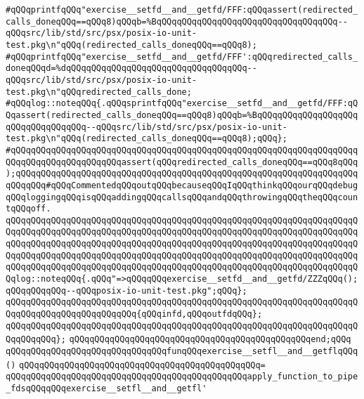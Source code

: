 \newline
\verb|#qQQqprintfqQQq"exercise__setfd__and__getfd/FFF:qQQqassert(redirected_calls_doneqQQq==qQQq8)qQQqb=%BqQQqqQQqqQQqqQQqqQQqqQQqqQQqqQQqqQQq--qQQqsrc/lib/std/src/psx/posix-io-unit-test.pkg\n"qQQq(redirected_calls_doneqQQq==qQQq8);|\newline
\verb|#qQQqprintfqQQq"exercise__setfd__and__getfd/FFF':qQQqredirected_calls_doneqQQqd=%dqQQqqQQqqQQqqQQqqQQqqQQqqQQqqQQqqQQq--qQQqsrc/lib/std/src/psx/posix-io-unit-test.pkg\n"qQQqredirected_calls_done;|\newline
\verb|#qQQqlog::noteqQQq{.qQQqsprintfqQQq"exercise__setfd__and__getfd/FFF:qQQqassert(redirected_calls_doneqQQq==qQQq8)qQQqb=%BqQQqqQQqqQQqqQQqqQQqqQQqqQQqqQQqqQQq--qQQqsrc/lib/std/src/psx/posix-io-unit-test.pkg\n"qQQq(redirected_calls_doneqQQq==qQQq8);qQQq};|\newline
\verb|#qQQqqQQqqQQqqQQqqQQqqQQqqQQqqQQqqQQqqQQqqQQqqQQqqQQqqQQqqQQqqQQqqQQqqQQqqQQqqQQqqQQqqQQqqQQqassert(qQQqredirected_calls_doneqQQq==qQQq8qQQq);qQQqqQQqqQQqqQQqqQQqqQQqqQQqqQQqqQQqqQQqqQQqqQQqqQQqqQQqqQQqqQQqqQQqqQQqqQQq#qQQqCommentedqQQqoutqQQqbecauseqQQqIqQQqthinkqQQqourqQQqdebugqQQqloggingqQQqisqQQqaddingqQQqcallsqQQqandqQQqthrowingqQQqtheqQQqcountqQQqoff.|\newline
\verb|qQQqqQQqqQQqqQQqqQQqqQQqqQQqqQQqqQQqqQQqqQQqqQQqqQQqqQQqqQQqqQQqqQQqqQQqqQQqqQQqqQQqqQQqqQQqqQQqqQQqqQQqqQQqqQQqqQQqqQQqqQQqqQQqqQQqqQQqqQQqqQQqqQQqqQQqqQQqqQQqqQQqqQQqqQQqqQQqqQQqqQQqqQQqqQQqqQQqqQQqqQQqqQQqqQQqqQQqqQQqqQQqqQQqqQQqqQQqqQQqqQQqqQQqqQQqqQQqqQQqqQQqqQQqqQQqqQQqqQQqqQQqqQQqqQQqqQQqqQQqqQQqqQQqqQQqqQQqqQQqqQQqqQQqqQQqqQQqqQQqqQQqqQQqqQQqlog::noteqQQq{.qQQq"=>qQQqqQQqexercise__setfd__and__getfd/ZZZqQQq();qQQqqQQqqQQq--qQQqposix-io-unit-test.pkg";qQQq};|\newline
\verb|qQQqqQQqqQQqqQQqqQQqqQQqqQQqqQQqqQQqqQQqqQQqqQQqqQQqqQQqqQQqqQQqqQQqqQQqqQQqqQQqqQQqqQQqqQQqqQQq{qQQqinfd,qQQqoutfdqQQq};|\newline
\verb|qQQqqQQqqQQqqQQqqQQqqQQqqQQqqQQqqQQqqQQqqQQqqQQqqQQqqQQqqQQqqQQqqQQqqQQqqQQqqQQq};|\newline
\verb|qQQqqQQqqQQqqQQqqQQqqQQqqQQqqQQqqQQqqQQqqQQqqQQqend;qQQq|\newline
\newline
\verb|qQQqqQQqqQQqqQQqqQQqqQQqqQQqqQQqfunqQQqexercise__setfl__and__getflqQQq()|\newline
\verb|qQQqqQQqqQQqqQQqqQQqqQQqqQQqqQQqqQQqqQQqqQQqqQQq=|\newline
\verb|qQQqqQQqqQQqqQQqqQQqqQQqqQQqqQQqqQQqqQQqqQQqqQQqapply_function_to_pipe_fdsqQQqqQQqexercise__setfl__and__getfl'|\newline

